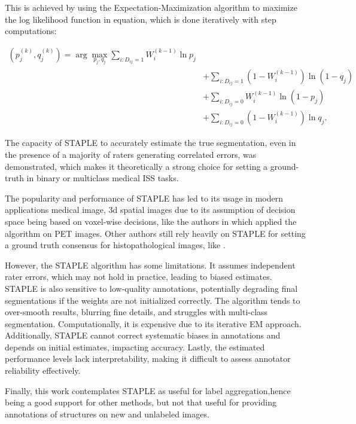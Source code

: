 This is achieved by using the Expectation-Maximization algorithm to
maximize the log likelihood function in equation, which is done iteratively
with step computations:

\begin{equation}
  \begin{split}
    (p_j^{(k)}, q_j^{(k)}) = \arg\max_{p_j, q_j} \sum_{i:D_{ij}=1}
    W_i^{(k-1)} \ln p_j \\
    &+ \sum_{i:D_{ij}=1} \left(1 - W_i^{(k-1)}\right) \ln (1 - q_j) \\
    &+ \sum_{i:D_{ij}=0} W_i^{(k-1)} \ln (1 - p_j) \\
    &+ \sum_{i:D_{ij}=0} \left(1 - W_i^{(k-1)}\right) \ln q_j.
  \end{split}
\end{equation}

The capacity of STAPLE to accurately estimate the true segmentation,
even in the presence of a majority of raters generating correlated
errors, was demonstrated, which makes it theoretically a strong
choice for setting a ground-truth in binary or multiclass medical
\gls{ISS} tasks.

The popularity and performance of \gls{STAPLE} has led to its
usage in modern applications medical image, 3d spatial images due to
its assumption of decision space being based on voxel-wise decisions,
like the authors in \cite{GrefveEtAl2024} which applied the algorithm
on \gls{PET} images. Other authors still rely heavily on STAPLE for
setting a ground truth consensus for histopathological images, like
\cite{QiuEtAl2022}.

However, the \gls{STAPLE} algorithm has some limitations. It
assumes independent rater errors, which may not hold in practice,
leading to biased estimates. STAPLE is also sensitive to low-quality
annotations, potentially degrading final segmentations if the weights
are not initialized correctly. The algorithm tends to over-smooth
results, blurring fine details, and struggles with multi-class
segmentation. Computationally, it is expensive due to its iterative
EM approach. Additionally, STAPLE cannot correct systematic biases in
annotations and depends on initial estimates, impacting accuracy.
Lastly, the estimated performance levels lack interpretability,
making it difficult to assess annotator reliability effectively.

Finally, this work contemplates \gls{STAPLE} as useful for label
aggregation,hence being a good support for other methods, but not
that useful for providing annotations of structures on
new and unlabeled images.

